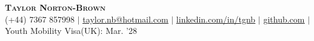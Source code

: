 \documentclass[letterpaper,11pt]{article}
\begin{document}

\begin{center}
    \textbf{\Huge \scshape Taylor Norton-Brown} \\ \vspace{1pt}
    \small (+44) 7367 857998 $|$ 
    \href{mailto:taylor.nb@hotmail.com}{\underline{taylor.nb@hotmail.com}} $|$ 
    \href{https://linkedin.com/in/tgnb}{\underline{linkedin.com/in/tgnb}} $|$
    \href{https://github.com/lil-snorts}{\underline{github.com}} $|$
    \small Youth Mobility Visa(UK): Mar. '28
\end{center}

\end{document}
